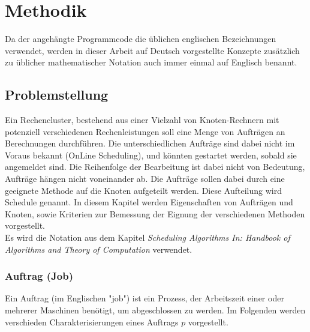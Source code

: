 \chapter{Methodik}
Da der angehängte Programmcode die üblichen englischen Bezeichnungen verwendet, werden in dieser Arbeit auf Deutsch vorgestellte Konzepte zusätzlich zu üblicher mathematischer Notation auch immer einmal auf Englisch benannt.

\section{Problemstellung}

Ein Rechencluster, bestehend aus einer Vielzahl von Knoten-Rechnern mit potenziell verschiedenen Rechenleistungen soll eine Menge von Aufträgen an Berechnungen durchführen. Die unterschiedlichen Aufträge sind dabei nicht im Voraus bekannt (OnLine Scheduling), und könnten gestartet werden, sobald sie angemeldet sind. Die Reihenfolge der Bearbeitung ist dabei nicht von Bedeutung, Aufträge hängen nicht voneinander ab. Die Aufträge sollen dabei durch eine geeignete Methode auf die Knoten aufgeteilt werden. Diese Aufteilung wird Schedule genannt. In diesem Kapitel werden Eigenschaften von Aufträgen und Knoten, sowie Kriterien zur Bemessung der Eignung der verschiedenen Methoden vorgestellt.\\
Es wird die Notation aus dem Kapitel \emph{Scheduling Algorithms In: Handbook of Algorithms and Theory of Computation} 
\cite{Kar97} verwendet.


\subsection{Auftrag (Job)}
Ein Auftrag (im Englischen "job") ist ein Prozess, der Arbeitszeit einer oder mehrerer Maschinen benötigt, um abgeschlossen zu werden. Im Folgenden werden verschieden Charakterisierungen eines Auftrags $p$ vorgestellt.

